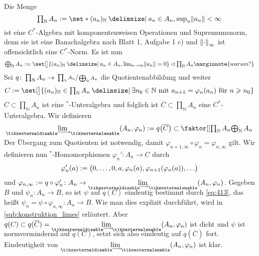 \begin{beweis}
	Die Menge
	\[
		\textstyle\prod_\mathbb{N} A_n := \set*{(a_n)_\mathbb{N} \given a_n \in A_n, \sup_n \norm*{a_n} < \infty}
	\]
	ist eine $C^*$-Algebra mit komponentenweisen Operationen und Supremumsnorm, denn sie ist eine Banachalgebra nach Blatt 1, Aufgabe 1 c) und $\norm*{\cdot}_\infty$ ist offensichtlich eine $C^*$-Norm.
	Es ist nun
	\[
		\textstyle\bigoplus_\mathbb{N} A_n := \set[\big]{(a_n)_\mathbb{N} \given a_n \in A_n , \lim_{n \to \infty} \norm*{a_n}=0} \lhd \prod_\mathbb{N} A_n \marginnote{warum?}
	\]
	Sei $q \colon \prod_\mathbb{N} A_n \to \sfrac{\prod_\mathbb{N} A_n}{\bigoplus_\mathbb{N} A_n}$ die Quotientenabbildung und weiter
	\[
		\textstyle C := \set[\big]{(a_n)_\mathbb{N} \in \prod\nolimits_\mathbb{N} A_n \given  \exists n_0 \in \mathbb{N} \text{ mit } a_{n+1}= \varphi_n(a_n) \text{ für } n \ge n_0}
	\]
	$C \subset \prod_\mathbb{N} A_n$ ist eine $^*$-Unteralgebra und folglich ist $\overline{C} \subset \prod_\mathbb{N} A_n$ eine $C^*$-Unteralgebra.
	Wir definieren 
	\[
		\Dlim(A_n,\varphi_n) := q \enbrace*{\overline{C}} \subset \Faktor{\prod\nolimits_\mathbb{N} A_n}{\bigoplus\nolimits_\mathbb{N} A_n}
	\]
	Der Übergang zum Quotienten ist notwendig, damit $\varphi_{n+1,\infty} \circ \varphi_{n} = \varphi_{n,\infty}$ gilt.
	Wir definieren nun $^*$-Homomorphismen $\varphi_n' \colon A_n \to C$ durch 
	\[
		\varphi_n'(a) := \enbrace[\big]{0, \ldots ,0,a,\varphi_n(a), \varphi_{n+1}(\varphi_n(a)),\ldots } 
	\]
	und $\varphi_{n,\infty} := q \circ \varphi_n' \colon A_n \to \Dlim(A_n,\varphi_n)$. 
	Gegeben $B$ und $\psi_n \colon A_n \to B$, so ist $\psi$ auf $q(C)$ eindeutig bestimmt durch \eqref{eq:413}, das heißt $\psi_n = \psi \circ \varphi_{n,\infty} \colon A_n \to B$.
	Wie man dies explizit durchführt, wird in \cref{sub:konstruktion_limes} erläutert.
	Aber $q(C) \subset q(\overline{C})= \Dlim(A_n,\varphi_n)$ ist dicht und $\psi$ ist normvermindernd auf $q(C)$, setzt sich also eindeutig auf $q(\overline{C})$ fort.
	Eindeutigkeit von $\Dlim (A_n,\varphi_n)$ ist klar.
\end{beweis}

